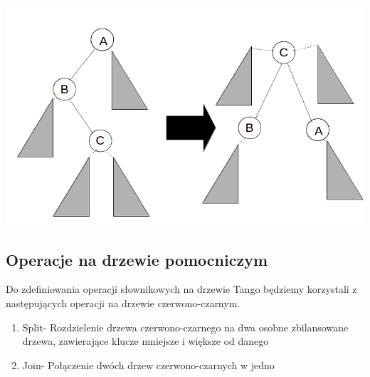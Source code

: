 \documentclass[declaration,shortabstract]{iithesis}
\theoremstyle{thm}
\theoremstyle{remark}
\theoremstyle{plain}
\theoremstyle{plain}
\theoremstyle{plain}
\begin{document}
\includegraphics[scale=0.5]{Tango_path2.png}  

\subsection{Operacje na drzewie pomocniczym} Do zdefiniowania operacji słownikowych na drzewie Tango będziemy korzystali z następujących operacji na drzewie czerwono-czarnym. 
\begin{enumerate} 
\item{Split- Rozdzielenie drzewa czerwono-czarnego na dwa osobne zbilansowane drzewa, zawierające klucze mniejsze i większe od danego} 
\item{Join- Połączenie dwóch drzew czerwono-czarnych w jedno} 
\end{enumerate} 
\end{document}
